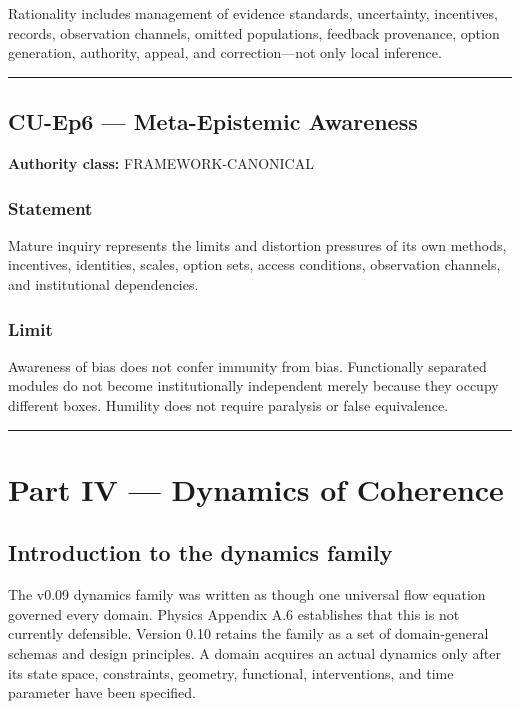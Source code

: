 \documentclass[
  11pt,
]{article}
\begin{document}
Rationality includes management of evidence standards, uncertainty,
incentives, records, observation channels, omitted populations, feedback
provenance, option generation, authority, appeal, and correction---not
only local inference.

\begin{center}\rule{0.5\linewidth}{0.5pt}\end{center}

\subsection{CU-Ep6 --- Meta-Epistemic
Awareness}\label{cu-ep6-meta-epistemic-awareness}

\textbf{Authority class:} FRAMEWORK-CANONICAL

\subsubsection{Statement}\label{statement-40}

Mature inquiry represents the limits and distortion pressures of its own
methods, incentives, identities, scales, option sets, access conditions,
observation channels, and institutional dependencies.

\subsubsection{Limit}\label{limit-5}

Awareness of bias does not confer immunity from bias. Functionally
separated modules do not become institutionally independent merely
because they occupy different boxes. Humility does not require paralysis
or false equivalence.

\begin{center}\rule{0.5\linewidth}{0.5pt}\end{center}

\section{Part IV --- Dynamics of
Coherence}\label{part-iv-dynamics-of-coherence}

\subsection{Introduction to the dynamics
family}\label{introduction-to-the-dynamics-family}

The v0.09 dynamics family was written as though one universal flow
equation governed every domain. Physics Appendix A.6 establishes that
this is not currently defensible. Version 0.10 retains the family as a
set of domain-general schemas and design principles. A domain acquires
an actual dynamics only after its state space, constraints, geometry,
functional, interventions, and time parameter have been specified.
\end{document}
